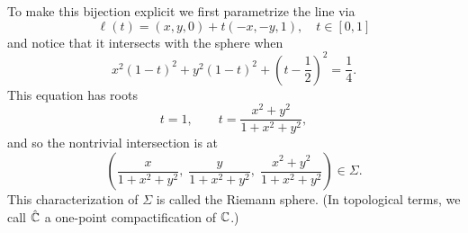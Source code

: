 \documentclass[../m136main.tex]{subfiles}
\begin{document}
To make this bijection explicit we first parametrize the line via
\[ \ell(t) = (x,y,0) + t (-x, -y, 1), \quad t \in [0,1] \]
and notice that it intersects with the sphere when
\[ x^2 (1-t)^2 + y^2(1-t)^2 + \left( t - \frac{1}{2} \right)^2 = \frac{1}{4}. \]
This equation has roots
\[ t = 1, \qquad t = \frac{x^2 + y^2}{1 + x^2 + y^2}, \]
and so the nontrivial intersection is at
\[ \left( \frac{x}{1 + x^2 + y^2}, \; \frac{y}{1 + x^2 + y^2}, \; \frac{x^2 + y^2}{1 + x^2 + y^2} \right) \in \Sigma. \]
This characterization of $\Sigma$ is called the Riemann sphere.
(In topological terms, we call $\hat {\mathbb{C}}$ a one-point compactification of $\mathbb{C}$.)
\end{document}
